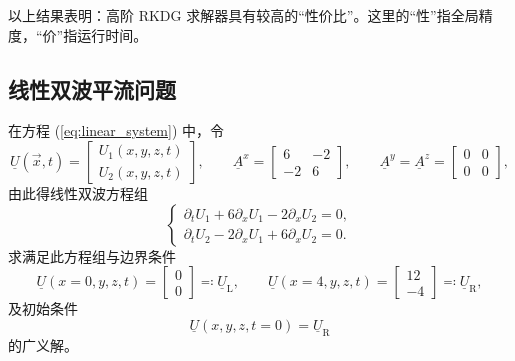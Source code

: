 以上结果表明：高阶 RKDG 求解器具有较高的“性价比”。这里的“性”指全局精度，“价”指运行时间。

\subsection{线性双波平流问题}
\begin{problem}
[线性双波平流]\label{prob:=007EBF=006027=0053CC=006CE2=005E73=006D41}在方程
(\ref{eq:linear_system}) 中，令
\begin{equation}
\underline{U}(\vec{x},t)=\begin{bmatrix}U_{1}(x,y,z,t)\\
U_{2}(x,y,z,t)
\end{bmatrix},\qquad\underline{A}^{x}=\begin{bmatrix}6 & -2\\
-2 & 6
\end{bmatrix},\qquad\underline{A}^{y}=\underline{A}^{z}=\begin{bmatrix}0 & 0\\
0 & 0
\end{bmatrix},
\end{equation}
由此得线性双波方程组
\begin{equation}
\begin{cases}
\partial_{t}U_{1}+6\partial_{x}U_{1}-2\partial_{x}U_{2}=0,\\
\partial_{t}U_{2}-2\partial_{x}U_{1}+6\partial_{x}U_{2}=0.
\end{cases}\label{eq:linear_double_wave}
\end{equation}
求满足此方程组与边界条件
\begin{equation}
\underline{U}(x=0,y,z,t)=\begin{bmatrix}0\\
0
\end{bmatrix}\eqqcolon\underline{U}_{\mathrm{L}},\qquad\underline{U}(x=4,y,z,t)=\begin{bmatrix}12\\
-4
\end{bmatrix}\eqqcolon\underline{U}_{\mathrm{R}},
\end{equation}
及初始条件
\begin{equation}
\underline{U}(x,y,z,t=0)=\underline{U}_{\mathrm{R}}
\end{equation}
的广义解。
\end{problem}

